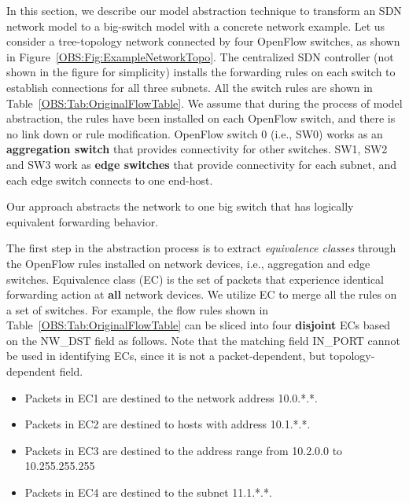 In this section, we describe our model abstraction technique to transform an SDN network model to a big-switch model with a concrete network example.
Let us consider a tree-topology network connected by four OpenFlow switches, as shown in Figure~\ref{OBS:Fig:ExampleNetworkTopo}.
The centralized SDN controller (not shown in the figure for simplicity) installs the forwarding rules on each switch to establish connections for all three subnets.
All the switch rules are shown in Table~\ref{OBS:Tab:OriginalFlowTable}.
We assume that during the process of model abstraction, the rules have been installed on each OpenFlow switch,
and there is no link down or rule modification. OpenFlow switch 0 (i.e., SW0) works as an \textbf{aggregation switch}
that provides connectivity for other switches. SW1, SW2 and SW3 work as \textbf{edge switches} that provide connectivity for each subnet,
and each edge switch connects to one end-host.

Our approach abstracts the network to one big switch that has logically equivalent forwarding behavior.

The first step in the abstraction process is to extract \textit{equivalence classes} through the OpenFlow rules installed on network devices, i.e., aggregation and edge switches.
Equivalence class (EC) is the set of packets that experience identical forwarding action at \textbf{all} network devices.
We utilize EC to merge all the rules on a set of switches. For example, the flow rules shown in Table~\ref{OBS:Tab:OriginalFlowTable} can be sliced into
four \textbf{disjoint} ECs based on the NW\_DST field as follows. Note that the matching field IN\_PORT cannot be used in identifying ECs,
since it is not a packet-dependent, but topology-dependent field.

\begin{itemize}
    \item Packets in EC1 are destined to the network address 10.0.*.*.
    \item Packets in EC2 are destined to hosts with address 10.1.*.*.
    \item Packets in EC3 are destined to the address range from 10.2.0.0 to 10.255.255.255
    \item Packets in EC4 are destined to the subnet 11.1.*.*.
\end{itemize}

